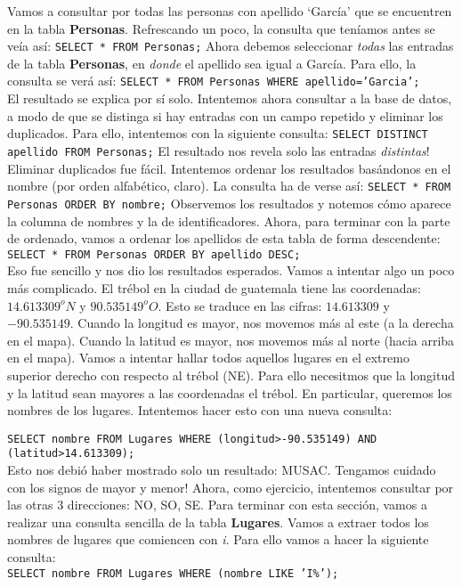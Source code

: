\documentclass[10pt,letterpaper]{article}
\newcommand{\inlinecode}[1]{
\colorbox{light-gray}{\texttt{#1}}
}
\begin{document}
Vamos a consultar por todas las personas con apellido `Garc\'ia' que se encuentren en la tabla \textbf{Personas}. Refrescando un poco, la consulta que ten\'iamos antes se ve\'ia as\'i: \inlinecode{SELECT * FROM Personas;} Ahora debemos seleccionar \emph{todas} las entradas de la tabla \textbf{Personas}, en \emph{donde} el apellido sea igual a Garc\'ia. Para ello, la consulta se ver\'a as\'i: \inlinecode{SELECT * FROM Personas WHERE apellido='Garcia';}\\

El resultado se explica por s\'i solo. Intentemos ahora consultar a la base de datos, a modo de que se distinga si hay entradas con un campo repetido y eliminar los duplicados. Para ello, intentemos con la siguiente consulta: \inlinecode{SELECT DISTINCT apellido FROM Personas;} El resultado nos revela solo las entradas \emph{distintas}! Eliminar duplicados fue f\'acil. Intentemos ordenar los resultados bas\'andonos en el nombre (por orden alfab\'etico, claro). La consulta ha de verse as\'i: \inlinecode{SELECT * FROM Personas ORDER BY nombre;} Observemos los resultados y notemos c\'omo aparece la columna de nombres y la de identificadores. Ahora, para terminar con la parte de ordenado, vamos a ordenar los apellidos de esta tabla de forma descendente: \inlinecode{SELECT * FROM Personas ORDER BY apellido DESC;}\\

Eso fue sencillo y nos dio los resultados esperados. Vamos a intentar algo un poco m\'as complicado. El tr\'ebol en la ciudad de guatemala tiene las coordenadas: $14.613309^o N$ y $90.535149^o O$. Esto se traduce en las cifras: $14.613309$ y $-90.535149$. Cuando la longitud es mayor, nos movemos m\'as al este (a la derecha en el mapa). Cuando la latitud es mayor, nos movemos m\'as al norte (hacia arriba en el mapa). Vamos a intentar hallar todos aquellos lugares en el extremo superior derecho con respecto al tr\'ebol (NE). Para ello necesitmos que la longitud y la latitud sean mayores a las coordenadas el tr\'ebol. En particular, queremos los nombres de los lugares. Intentemos hacer esto con una nueva consulta:
\inlinecode{SELECT nombre FROM Lugares WHERE (longitud>-90.535149) AND (latitud>14.613309);}\\

Esto nos debi\'o haber mostrado solo un resultado: MUSAC. Tengamos cuidado con los signos de mayor y menor! Ahora, como ejercicio, intentemos consultar por las otras 3 direcciones: NO, SO, SE. Para terminar con esta secci\'on, vamos a realizar una consulta sencilla de la tabla \textbf{Lugares}. Vamos a extraer todos los nombres de lugares que comiencen con \emph{i}. Para ello vamos a hacer la siguiente consulta:\\ \inlinecode{SELECT nombre FROM Lugares WHERE (nombre LIKE 'I\%');}\\
\end{document}
